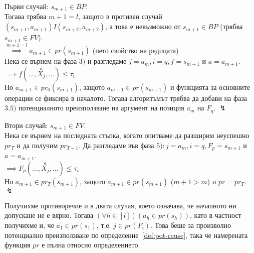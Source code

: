 \documentclass[12pt,twoside,a4paper]{article}
\begin{document}
\begin{statement}
		Първи случай: $s_{m+1} \in BP$.\\
		Тогава трябва $m+1 = l$, защото в противен случай $(s_{m+1}, a_{m+1})I(s_{m+2}, a_{m+2})$, а това е невъзможно от $s_{m+1} \in BP$ (трябва $s_{m+1} \in FV$).\\
		$\overset{m+1=l}{\implies} a_{m+1} \in pr(s_{m+1})$ (пето свойство на редицата)\\
		Нека се върнем на фаза $3)$ и разгледаме $j = a_m, i = q, f = s_{m+1}$ и $a = a_{m+1}$.\\
		$\implies f(\dots,\overset{a}{X_j},\dots) \le \tau_i$\\
		Но $a_{m+1} \in pr_0(s_{m+1})$, защото $a_{m+1} \in pr(s_{m+1})$ и функцията за основните операции се фиксира в началото.
		Тогава алгоритъмът трябва да добави на фаза $3.5)$ потенциалното преизползване на аргумент на позиция $a_m$ на $F_q$. $\lightning$
		
		Втори случай: $s_{m+1} \in FV$.\\
		Нека се върнем на последната стъпка, когато опитваме да разширим неуспешно $pr_T$ и да получим $pr_{T+1}$. Да разгледаме във фаза $5): j = a_m, i = q, F_p = s_{m+1}$ и $a = a_{m+1}$.\\
		$\implies F_p(\dots,\overset{a}{X_j},\dots) \le \tau_i$\\
		Но $a_{m+1} \in pr_T(s_{m+1})$, защото $a_{m+1} \in pr(s_{m+1})$ ($m+1 > m$) и $pr = pr_T$. $\lightning$
		
		Получихме противоречие и в двата случая, което означава, че началното ни допускане не е вярно. Тогава $(\forall h \in [l])(a_h \in pr(s_h))$, като в частност получихме и, че $a_1 \in pr(s_1)$, т.е. $j \in pr(F_i)$. Това беше за произволно потенциално преизползване по определение~\ref{def:pot-reuse}, така че намерената функция $pr$ е пълна относно определението.
	\end{statement}
	
\end{document}

